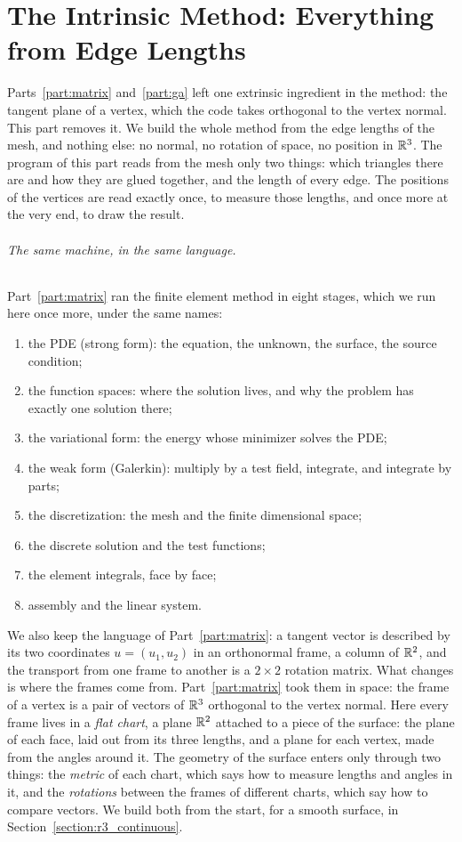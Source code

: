 \part{The Intrinsic Method: Everything from Edge Lengths}
\label{part:intrinsic}

Parts~\ref{part:matrix} and~\ref{part:ga} left one extrinsic ingredient in the method: the tangent plane of a vertex, which the code takes orthogonal to the vertex normal. This part removes it. We build the whole method from the edge lengths of the mesh, and nothing else: no normal, no rotation of space, no position in $\mathbb{R}^3$. The program of this part reads from the mesh only two things: which triangles there are and how they are glued together, and the length of every edge. The positions of the vertices are read exactly once, to measure those lengths, and once more at the very end, to draw the result.

\paragraph{The same machine, in the same language.} Part~\ref{part:matrix} ran the finite element method in eight stages, which we run here once more, under the same names:
\begin{enumerate}
\item the PDE (strong form): the equation, the unknown, the surface, the source condition;
\item the function spaces: where the solution lives, and why the problem has exactly one solution there;
\item the variational form: the energy whose minimizer solves the PDE;
\item the weak form (Galerkin): multiply by a test field, integrate, and integrate by parts;
\item the discretization: the mesh and the finite dimensional space;
\item the discrete solution and the test functions;
\item the element integrals, face by face;
\item assembly and the linear system.
\end{enumerate}
We also keep the language of Part~\ref{part:matrix}: a tangent vector is described by its two coordinates $u = (u_1, u_2)$ in an orthonormal frame, a column of $\mathbb{R}^2$, and the transport from one frame to another is a $2 \times 2$ rotation matrix. What changes is where the frames come from. Part~\ref{part:matrix} took them in space: the frame of a vertex is a pair of vectors of $\mathbb{R}^3$ orthogonal to the vertex normal. Here every frame lives in a \emph{flat chart}, a plane $\mathbb{R}^2$ attached to a piece of the surface: the plane of each face, laid out from its three lengths, and a plane for each vertex, made from the angles around it. The geometry of the surface enters only through two things: the \emph{metric} of each chart, which says how to measure lengths and angles in it, and the \emph{rotations} between the frames of different charts, which say how to compare vectors. We build both from the start, for a smooth surface, in Section~\ref{section:r3_continuous}.


